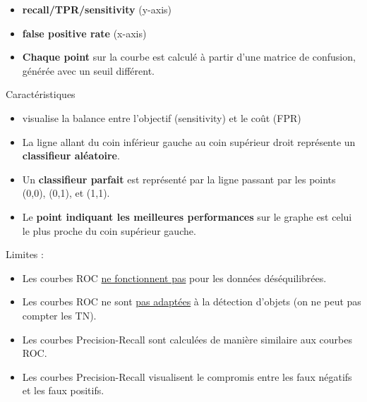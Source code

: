 \documentclass[a4paper,portrait]{article}
\begin{document}
\begin{multicols}{2}
\begin{itemize}
    \item \textbf{recall/TPR/sensitivity} (y-axis)
    \item \textbf{false positive rate} (x-axis)
    \item \textbf{Chaque point} sur la courbe est calculé à partir d'une matrice de confusion, générée avec un seuil différent.
\end{itemize}
Caractéristiques
\begin{itemize}
    \item visualise la balance entre l'objectif (sensitivity) et le coût (FPR)
    \item La ligne allant du coin inférieur gauche au coin supérieur droit représente un \textbf{classifieur aléatoire}.
    \item Un \textbf{classifieur parfait} est représenté par la ligne passant par les points (0,0), (0,1), et (1,1).

    \item Le \textbf{point indiquant les meilleures performances} sur le graphe est celui le plus proche du coin supérieur gauche.
\end{itemize}
Limites :
\begin{itemize}

    \item Les courbes ROC \underline{ne fonctionnent pas} pour les données déséquilibrées.
    \item Les courbes ROC ne sont \underline{pas adaptées} à la détection d'objets (on ne peut pas compter les TN).
    \item Les courbes Precision-Recall sont calculées de manière similaire aux courbes ROC.
    \item Les courbes Precision-Recall visualisent le compromis entre les faux négatifs et les faux positifs.
\end{itemize}

\newpage

\end{multicols}
\end{document}
